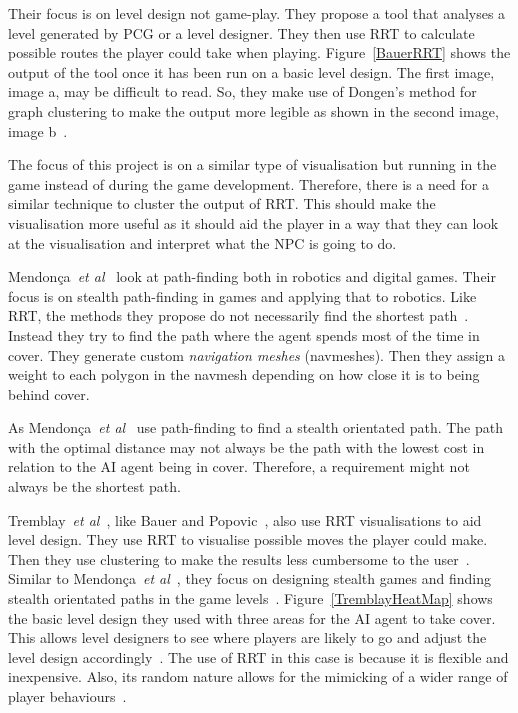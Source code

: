 \documentclass[journal]{IEEEtran}
\begin{document}
Their focus is on level design not game-play. They propose a tool that analyses a level generated by PCG or a level designer. They then use RRT to calculate possible routes the player could take when playing.  Figure~\ref{BauerRRT} shows the output of the tool once it has been run on a basic level design.  The first image, image a, may be difficult to read. So, they make use of Dongen's method for graph clustering to make the output more legible as shown in the second image, image b~\cite{bauer2012,Dongen2001}.  

The focus of this project is on a similar type of visualisation but running in the game instead of during the game development. Therefore, there is a need for a similar technique to cluster the output of RRT. This should make the visualisation more useful as it should aid the player in a way that they can look at the visualisation and interpret what the NPC is going to do. 

Mendonça~\textit{et al}~\cite{Mendonça2015} look at path-finding both in robotics and digital games. Their focus is on stealth path-finding in games and applying that to robotics. Like RRT, the methods they propose do not necessarily find the shortest path~\cite{karaman2010,Mendonça2015}. Instead they try to find the path where the agent spends most of the time in cover. They generate custom \textit{navigation meshes} (navmeshes). Then they assign a weight to each polygon in the navmesh depending on how close it is to being behind cover. 

As Mendonça~\textit{et al}~\cite{Mendonça2015} use path-finding to find a stealth orientated path. The path with the optimal distance may not always be the path with the lowest cost in relation to the AI agent being in cover. Therefore, a requirement might not always be the shortest path. 

Tremblay~\textit{et al}~\cite{Tremblay2013}, like Bauer and Popovic~\cite{bauer2012}, also use RRT visualisations to aid level design. They use RRT to visualise possible moves the player could make. Then they use clustering to make the results less cumbersome to the user~\cite{Tremblay2013}. Similar to Mendonça~\textit{et al}~\cite{Mendonça2015}, they focus on designing stealth games and finding stealth orientated paths in the game levels~\cite{Tremblay2013}.   Figure~\ref{TremblayHeatMap} shows the basic level design they used with three areas for the AI agent to take cover. This allows level designers to see where players are likely to go and adjust the level design accordingly~\cite{Tremblay2013}.  The use of RRT in this case is because it is flexible and inexpensive. Also, its random nature allows for the mimicking of a wider range of player behaviours~\cite{Tremblay2013}. 
\end{document}
